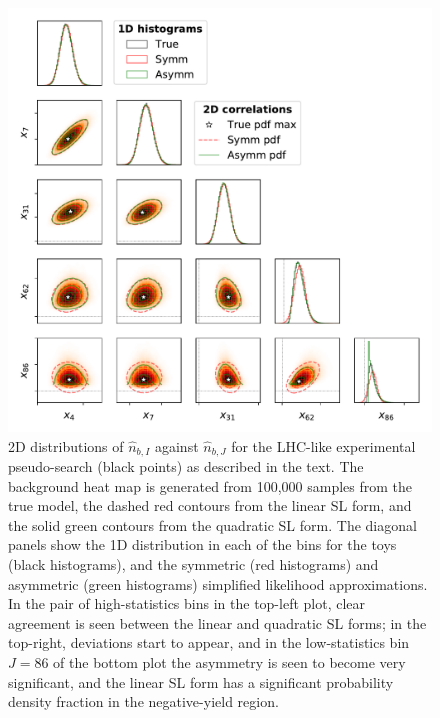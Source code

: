 \documentclass[11pt]{article}
\begin{document}
\begin{figure}[t]
  \centering
  \includegraphics[width=\textwidth]{figures/plotmatrix}
  \caption{2D distributions of $\hat{n}_{b,I}$ against $\hat{n}_{b,J}$ for the LHC-like 
    experimental pseudo-search (black points) as described in the text. The
    background heat map is generated from 100,000 samples from the true 
    model, the dashed red contours from the linear SL form, and the solid
    green contours from the quadratic SL form. The diagonal panels show the
    1D distribution in each of the bins for the toys (black histograms), and the
    symmetric (red histograms) and asymmetric (green histograms) simplified likelihood approximations.
    In the pair of
    high-statistics bins in the top-left plot, clear agreement is seen between
    the linear and quadratic SL forms; in the top-right, deviations start to
    appear, and in the low-statistics bin~$J=86$ of the bottom plot the
    asymmetry is seen to become very significant, and the linear SL form has a
    significant probability density fraction in the negative-yield region.}
  \label{fig:distributions2d}
\end{figure}
\end{document}
